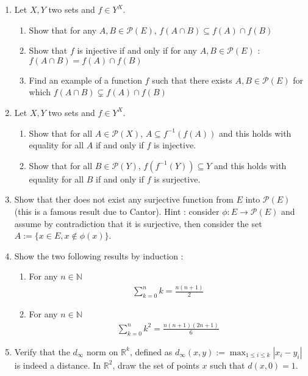 \documentclass[11pt,letterpaper]{scrartcl}
\newcommand{\reals}{\mathbb{R}}
\newcommand{\naturals}{\mathbb{N}}
\newcommand{\Pcal}{\mathcal{P}}
\begin{document}
\begin{enumerate}
	\item Let $X,Y$ two sets and $f \in Y^X$. 
	\begin{enumerate}[label=\alph*.]
		\item Show that for any $A,B \in \Pcal(E)$, $f(A \cap B) \subseteq f(A) \cap f(B)$
		\item Show that $f$ is injective if and only if for any $A,B \in \Pcal(E)$ : $f(A \cap B) = f(A) \cap f(B)$
		\item Find an example of a function $f$ such that there exists $A,B \in \Pcal(E)$ for which $f(A \cap B) \subsetneq f(A) \cap f(B)$
	\end{enumerate}

	\item Let $X,Y$ two sets and $f \in Y^X$.
	\begin{enumerate}[label=\alph*.]
		\item Show that for all $A \in \Pcal(X)$, $A \subseteq f^{-1}(f(A))$ and this holds with equality for all $A$ if and only if $f$ is injective.
		\item Show that for all $B \in \Pcal(Y)$, $f(f^{-1}(Y)) \subseteq Y$ and this holds with equality for all $B$ if and only if $f$ is surjective.
	\end{enumerate}
	
	
	\item Show that ther does not exist any surjective function from $E$ into $\Pcal(E)$ (this is a famous result due to Cantor). Hint : consider $\phi : E \rightarrow \Pcal(E)$ and assume by contradiction that it is surjective, then consider the set $A:=\{x \in E, x \notin \phi(x) \}$.

	\item Show the two following results by induction :
	\begin{enumerate}[label=\alph*.]
		\item For any $n \in \naturals$
			\begin{align*}
			\sum_{k=0}^n k = \frac{n(n+1)}{2}
			\end{align*}
		\item For any $n \in \naturals$
			\begin{align*}
			\sum_{k=0}^n k^2 = \frac{n(n+1)(2n+1)}{6}
			\end{align*}
	\end{enumerate}	
	
	\item Verify that the $d_\infty$ norm on $\reals^k$, defined as $d_\infty(x,y):=\max_{1\leq i \leq k} |x_i-y_i|$ is indeed a distance. In $\reals^2$, draw the set of points $x$ such that $d(x,0)=1$.


\end{enumerate}
\end{document}
